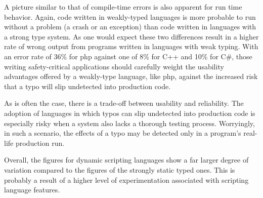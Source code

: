 \documentclass[10pt]{sigplanconf}
\begin{document}
A picture similar to that of compile-time errors
is also apparent for run time behavior.
Again, code written in weakly-typed languages is more probable to run without
a problem (a crash or an exception)
than code written in languages with a strong type system.
As one would expect these two differences result in a higher rate of
wrong output from programs written in languages with weak typing.
With an error rate of 36\% for {\sc php} against one of 8\% for
C++ and 10\% for C\#,
those writing safety-critical applications should carefully
weight the usability advantages offered by a weakly-type language,
like {\sc php}, against the increased risk that a typo
will slip undetected into production code.

As is often the case,
there is a trade-off between usability and reliability.
The adoption of languages in which typos can slip undetected
into production code is especially risky when a system also lacks
a thorough testing process.
Worryingly, in such a scenario, the effects of a typo may be
detected only in a program's real-life production run.

Overall, the figures for dynamic scripting languages show a far larger
degree of variation compared to the figures of the strongly static typed
ones.
This is probably a result of a higher level of experimentation
associated with scripting language features.
\end{document}
